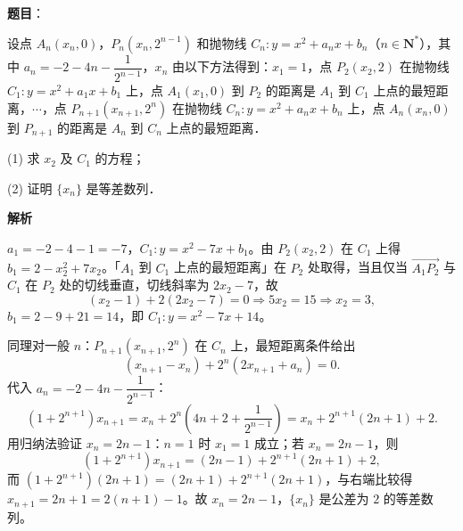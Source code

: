 \begin{answer}

\textbf{题目}：

设点 $A_n(x_n, 0)$，$P_n(x_n, 2^{n-1})$ 和抛物线 $C_n: y = x^2 + a_nx + b_n$（$n \in \mathbf{N}^*$），其中 $a_n = -2 - 4n - \dfrac{1}{2^{n-1}}$，$x_n$ 由以下方法得到：$x_1 = 1$，点 $P_2(x_2, 2)$ 在抛物线 $C_1: y = x^2 + a_1x + b_1$ 上，点 $A_1(x_1, 0)$ 到 $P_2$ 的距离是 $A_1$ 到 $C_1$ 上点的最短距离，$\cdots$，点 $P_{n+1}(x_{n+1}, 2^n)$ 在抛物线 $C_n: y = x^2 + a_nx + b_n$ 上，点 $A_n(x_n, 0)$ 到 $P_{n+1}$ 的距离是 $A_n$ 到 $C_n$ 上点的最短距离．

(1) 求 $x_2$ 及 $C_1$ 的方程；

(2) 证明 $\{x_n\}$ 是等差数列．

\textbf{解析}


$a_1 = -2 - 4 - 1 = -7$，$C_1: y = x^2 - 7x + b_1$。由 $P_2(x_2, 2)$ 在 $C_1$ 上得 $b_1 = 2 - x_2^2 + 7x_2$。「$A_1$ 到 $C_1$ 上点的最短距离」在 $P_2$ 处取得，当且仅当 $\overrightarrow{A_1P_2}$ 与 $C_1$ 在 $P_2$ 处的切线垂直，切线斜率为 $2x_2 - 7$，故
\nopagebreak[4]
\[
(x_2 - 1) + 2(2x_2 - 7) = 0 \Rightarrow 5x_2 = 15 \Rightarrow x_2 = 3,
\]
$b_1 = 2 - 9 + 21 = 14$，即 $C_1: y = x^2 - 7x + 14$。


同理对一般 $n$：$P_{n+1}(x_{n+1}, 2^n)$ 在 $C_n$ 上，最短距离条件给出
\nopagebreak[4]
\[
(x_{n+1} - x_n) + 2^n\left(2x_{n+1} + a_n\right) = 0.
\]
代入 $a_n = -2 - 4n - \dfrac{1}{2^{n-1}}$：
\nopagebreak[4]
\[
(1 + 2^{n+1})x_{n+1} = x_n + 2^n\left(4n + 2 + \frac{1}{2^{n-1}}\right) = x_n + 2^{n+1}(2n + 1) + 2.
\]
用归纳法验证 $x_n = 2n - 1$：$n = 1$ 时 $x_1 = 1$ 成立；若 $x_n = 2n - 1$，则
\nopagebreak[4]
\[
(1 + 2^{n+1})x_{n+1} = (2n - 1) + 2^{n+1}(2n + 1) + 2,
\]
而 $(1 + 2^{n+1})(2n + 1) = (2n + 1) + 2^{n+1}(2n + 1)$，与右端比较得 $x_{n+1} = 2n + 1 = 2(n + 1) - 1$。故 $x_n = 2n - 1$，$\{x_n\}$ 是公差为 $2$ 的等差数列。



\end{answer}